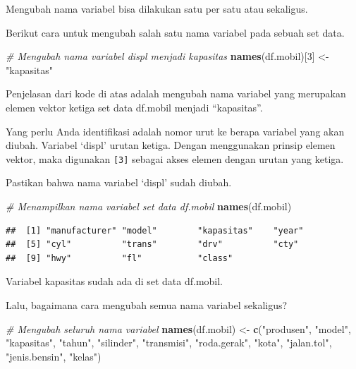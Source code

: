 \documentclass[openany]{book}
\newenvironment{Shaded}{\begin{snugshade}}{\end{snugshade}}
\newcommand{\KeywordTok}[1]{\textcolor[rgb]{0.13,0.29,0.53}{\textbf{#1}}}
\newcommand{\DecValTok}[1]{\textcolor[rgb]{0.00,0.00,0.81}{#1}}
\newcommand{\StringTok}[1]{\textcolor[rgb]{0.31,0.60,0.02}{#1}}
\newcommand{\CommentTok}[1]{\textcolor[rgb]{0.56,0.35,0.01}{\textit{#1}}}
\newcommand{\NormalTok}[1]{#1}
\begin{document}
Mengubah nama variabel bisa dilakukan satu per satu atau sekaligus.

Berikut cara untuk mengubah salah satu nama variabel pada sebuah set
data.

\begin{Shaded}
\begin{Highlighting}[]
\CommentTok{# Mengubah nama variabel displ menjadi kapasitas}
\KeywordTok{names}\NormalTok{(df.mobil)[}\DecValTok{3}\NormalTok{] <-}\StringTok{ "kapasitas"}
\end{Highlighting}
\end{Shaded}

Penjelasan dari kode di atas adalah mengubah nama variabel yang
merupakan elemen vektor ketiga set data df.mobil menjadi ``kapasitas''.

Yang perlu Anda identifikasi adalah nomor urut ke berapa variabel yang
akan diubah. Variabel `displ' urutan ketiga. Dengan menggunakan prinsip
elemen vektor, maka digunakan \texttt{{[}3{]}} sebagai akses elemen
dengan urutan yang ketiga.

Pastikan bahwa nama variabel `displ' sudah diubah.

\begin{Shaded}
\begin{Highlighting}[]
\CommentTok{# Menampilkan nama variabel set data df.mobil}
\KeywordTok{names}\NormalTok{(df.mobil)}
\end{Highlighting}
\end{Shaded}

\begin{verbatim}
##  [1] "manufacturer" "model"        "kapasitas"    "year"        
##  [5] "cyl"          "trans"        "drv"          "cty"         
##  [9] "hwy"          "fl"           "class"
\end{verbatim}

Variabel kapasitas sudah ada di set data df.mobil.

Lalu, bagaimana cara mengubah semua nama variabel sekaligus?

\begin{Shaded}
\begin{Highlighting}[]
\CommentTok{# Mengubah seluruh nama variabel }
\KeywordTok{names}\NormalTok{(df.mobil) <-}\StringTok{ }\KeywordTok{c}\NormalTok{(}\StringTok{"produsen"}\NormalTok{, }\StringTok{"model"}\NormalTok{, }\StringTok{"kapasitas"}\NormalTok{, }\StringTok{"tahun"}\NormalTok{, }\StringTok{"silinder"}\NormalTok{, }\StringTok{"transmisi"}\NormalTok{, }\StringTok{"roda.gerak"}\NormalTok{, }\StringTok{"kota"}\NormalTok{, }\StringTok{"jalan.tol"}\NormalTok{, }\StringTok{"jenis.bensin"}\NormalTok{, }\StringTok{"kelas"}\NormalTok{)}
\end{Highlighting}
\end{Shaded}
\end{document}
